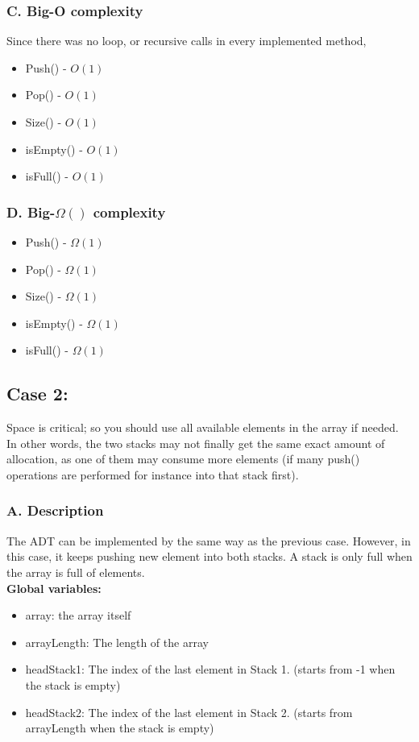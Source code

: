 \documentclass[16pt, letterpaper]{article}
\begin{document}
\subsubsection*{C. Big-O complexity}
Since there was no loop, or recursive calls in every implemented method,
\begin{itemize}
    \item Push() - $O(1)$
    \item Pop() - $O(1)$
    \item Size() - $O(1)$
    \item isEmpty() - $O(1)$
    \item isFull() - $O(1)$
\end{itemize}

\subsubsection*{D. Big-$\Omega()$ complexity}
\begin{itemize}
    \item Push() - $\Omega(1)$
    \item Pop() - $\Omega(1)$
    \item Size() - $\Omega(1)$
    \item isEmpty() - $\Omega(1)$
    \item isFull() - $\Omega(1)$
\end{itemize}

\subsection{Case 2: }
Space is critical; so you should use all available elements in the array if needed. In other words, the two stacks may not finally get the same exact amount of allocation, as one of them may consume more elements (if many push() operations are performed for instance into that stack first).

\subsubsection*{A. Description}
The ADT can be implemented by the same way as the previous case. However, in this case, it keeps pushing new element into both stacks. A stack is only full when the array is full of elements.
\\
\textbf{Global variables:}
\begin{itemize} 
    \item array: the array itself
    \item arrayLength: The length of the array
    \item headStack1: The index of the last element in Stack 1. (starts from -1 when the stack is empty)
    \item headStack2: The index of the last element in Stack 2. (starts from arrayLength when the stack is empty)
\end{itemize}
\end{document}
